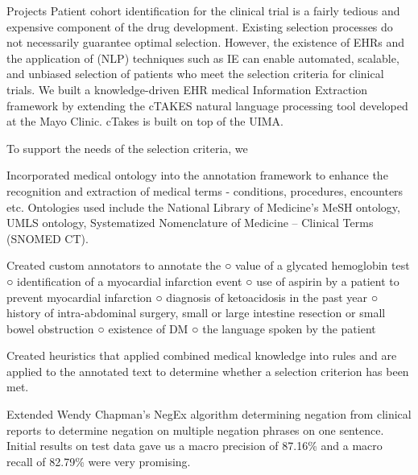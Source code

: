 \documentclass{resume} %
\begin{document}
\begin{rSection}{Projects}
Patient cohort identification for the clinical trial is a fairly tedious and expensive component of the drug
development. Existing selection processes do not necessarily guarantee optimal selection. However, the
existence of EHRs and the application of
(NLP) techniques such as IE can enable automated, scalable, and
unbiased selection of patients who meet the selection criteria for clinical trials.
We built a knowledge-driven EHR medical Information Extraction framework by extending the
cTAKES natural language processing tool developed at the Mayo Clinic. cTakes is built on top of
the UIMA.

To support the needs of the selection criteria, we

\item Incorporated medical ontology into the annotation framework to enhance the
recognition and extraction of medical terms - conditions, procedures, encounters etc.
Ontologies used include the National Library of Medicine's MeSH
ontology, UMLS ontology, Systematized
Nomenclature of Medicine -- Clinical Terms (SNOMED CT).
\item Created custom annotators to annotate the
○ value of a glycated hemoglobin test
○ identification of a myocardial infarction event
○ use of aspirin by a patient to prevent myocardial infarction
○ diagnosis of ketoacidosis in the past year
○ history of intra-abdominal surgery, small or large intestine resection or small
bowel obstruction
○ existence of DM
○ the language spoken by the patient
\item Created heuristics that applied combined medical knowledge into rules and are applied
to the annotated text to determine whether a selection criterion has been met.
\item Extended Wendy Chapman's NegEx algorithm determining negation from clinical reports
to determine negation on multiple negation phrases on one sentence.
Initial results on test data gave us a macro precision of 87.16\% and a macro recall of 82.79\%
were very promising. 

\end{rSection}


\end{document}
